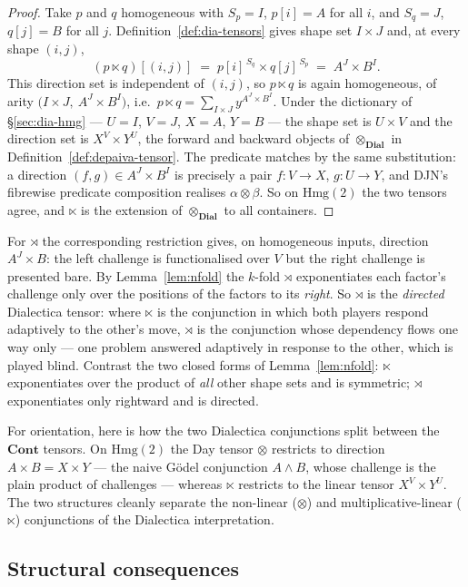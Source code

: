 \documentclass[11pt,a4paper]{article}
\newcommand{\Cont}{\mathbf{Cont}}
\newcommand{\dir}{\mathbin{\otimes}}
\newcommand{\Dial}{\mathbf{Dial}}
\newcommand{\Hmg}{\mathrm{Hmg}}
\newcommand{\dtens}{\mathbin{\otimes_{\Dial}}}
\theoremstyle{plain}
\theoremstyle{definition}
\theoremstyle{remark}
\begin{document}
\begin{proof}
Take $p$ and $q$ homogeneous with $S_p=I$, $p[i]=A$ for all $i$, and $S_q=J$,
$q[j]=B$ for all $j$. Definition~\ref{def:dia-tensors} gives shape set
$I\times J$ and, at every shape $(i,j)$,
\[
  (p\ltimes q)[(i,j)]\;=\;p[i]^{\,S_q}\times q[j]^{\,S_p}
    \;=\;A^{J}\times B^{I}.
\]
This direction set is independent of $(i,j)$, so $p\ltimes q$ is again
homogeneous, of arity $\bigl(I\times J,\ A^{J}\times B^{I}\bigr)$, i.e.\
$p\ltimes q=\sum_{I\times J}y^{A^{J}\times B^{I}}$. Under the dictionary of
§\ref{sec:dia-hmg} --- $U=I$, $V=J$, $X=A$, $Y=B$ --- the shape set is
$U\times V$ and the direction set is $X^{V}\times Y^{U}$, the forward and
backward objects of $\dtens$ in Definition~\ref{def:depaiva-tensor}. The
predicate matches by the same substitution: a direction $(f,g)\in A^{J}\times
B^{I}$ is precisely a pair $f\colon V\to X$, $g\colon U\to Y$, and DJN's fibrewise
predicate composition realises $\alpha\otimes\beta$. So on $\Hmg(2)$ the two
tensors agree, and $\ltimes$ is the extension of $\dtens$ to all containers.
\end{proof}

For $\rtimes$ the corresponding restriction gives, on homogeneous inputs,
direction $A^{J}\times B$: the left challenge is functionalised over $V$ but the
right challenge is presented bare. By Lemma~\ref{lem:nfold} the $k$-fold
$\rtimes$ exponentiates each factor's challenge only over the positions of the
factors to its \emph{right}. So $\rtimes$ is the \emph{directed} Dialectica
tensor: where $\ltimes$ is the conjunction in which both players respond
adaptively to the other's move, $\rtimes$ is the conjunction whose dependency
flows one way only --- one problem answered adaptively in response to the other,
which is played blind. Contrast the two closed forms of Lemma~\ref{lem:nfold}:
$\ltimes$ exponentiates over the product of \emph{all} other shape sets and is
symmetric; $\rtimes$ exponentiates only rightward and is directed.

For orientation, here is how the two Dialectica conjunctions split between the
$\Cont$ tensors. On $\Hmg(2)$ the Day tensor $\dir$ restricts to direction
$A\times B=X\times Y$ --- the naive Gödel conjunction $A\wedge B$, whose
challenge is the plain product of challenges --- whereas $\ltimes$ restricts to
the linear tensor $X^{V}\times Y^{U}$. The two structures cleanly separate the
non-linear ($\dir$) and multiplicative-linear ($\ltimes$) conjunctions of the
Dialectica interpretation.

\subsection{Structural consequences}
\label{sec:dia-consequences}
\end{document}
